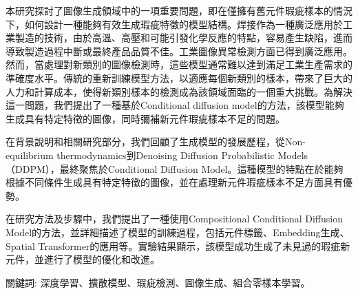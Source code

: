 \begin{abstractzh}

本研究探討了圖像生成領域中的一項重要問題，即在僅擁有舊元件瑕疵樣本的情況下，如何設計一種能夠有效生成瑕疵特徵的模型結構。焊接作為一種廣泛應用於工業製造的技術，由於高溫、高壓和可能引發化學反應的特點，容易產生缺陷，進而導致製造過程中斷或最終產品品質不佳。工業圖像異常檢測方面已得到廣泛應用。然而，當處理對新類別的圖像檢測時，這些模型通常難以達到滿足工業生產需求的準確度水平。傳統的重新訓練模型方法，以適應每個新類別的樣本，帶來了巨大的人力和計算成本，使得新類別樣本的檢測成為該領域面臨的一個重大挑戰。為解決這一問題，我們提出了一種基於Conditional diffusion model的方法，該模型能夠生成具有特定特徵的圖像，同時彌補新元件瑕疵樣本不足的問題。

在背景說明和相關研究部分，我們回顧了生成模型的發展歷程，從Non-equilibrium thermodynamics到Denoising Diffusion Probabilistic Models（DDPM），最終聚焦於Conditional Diffusion Model。這種模型的特點在於能夠根據不同條件生成具有特定特徵的圖像，並在處理新元件瑕疵樣本不足方面具有優勢。

在研究方法及步驟中，我們提出了一種使用Compositional Conditional Diffusion Model的方法，並詳細描述了模型的訓練過程，包括元件標籤、Embedding生成、Spatial Transformer的應用等。實驗結果顯示，該模型成功生成了未見過的瑕疵新元件，並進行了模型的優化和改進。



\vspace{6cm}

關鍵詞: 深度學習、擴散模型、瑕疵檢測、圖像生成、組合零樣本學習。

\end{abstractzh}